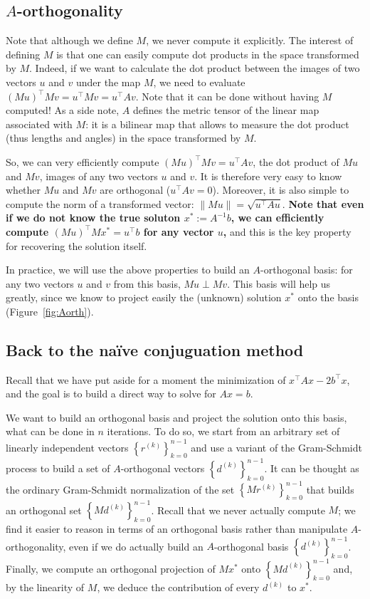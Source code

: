 \documentclass[notitlepage,oneside]{book}
\begin{document}
\subsection{$A$-orthogonality}

Note that although we define $M$, we never compute it explicitly.
The interest of defining $M$ is that one can easily compute dot products in the space transformed by $M$.
Indeed, if we want to calculate the dot product between the images of two vectors $u$ and $v$ under the map $M$,
we need to evaluate $(Mu)^\top Mv = u^\top Mv = u^\top Av$.
Note that it can be done without having $M$ computed! As a side note, $A$ defines the metric tensor of the linear map associated with $M$:
it is a bilinear map that allows to measure the dot product (thus lengths and angles) in the space transformed by $M$.


So, we can very efficiently compute $(Mu)^\top Mv = u^\top Av$, the dot product of $Mu$ and $Mv$, images of any two vectors $u$ and $v$.
It is therefore very easy to know whether $Mu$ and $Mv$ are orthogonal ($u^\top Av = $0).
Moreover, it is also simple to compute the norm of a transformed vector: $\|Mu\|=\sqrt{u^\top Au}$.
\textbf{Note that even if we do not know the true soluton $x^* := A^{-1}b$, we can efficiently compute $(Mu)^\top Mx^* = u^\top b$ for any vector $u$,}
and this is the key property for recovering the solution itself.


\begin{framed}
In practice, we will use the above properties to build an $A$-orthogonal basis: for any two vectors $u$ and $v$ from this basis, $Mu \perp Mv$.
This basis will help us greatly, since we know to project easily the (unknown) solution $x^*$ onto the basis (Figure~\ref{fig:Aorth}).
\end{framed}

\subsection{Back to the naïve conjuguation method}
Recall that we have put aside for a moment the minimization of $x^\top A x - 2b^\top x$,
and the goal is to build a direct way to solve for $Ax=b$.

We want to build an orthogonal basis and project the solution onto this basis, what can be done in $n$ iterations.
To do so, we start from an arbitrary set of linearly independent vectors $\left\{r^{(k)}\right\}_{k=0}^{n-1}$
and use a variant of the Gram-Schmidt process to build a set of $A$-orthogonal vectors $\left\{d^{(k)}\right\}_{k=0}^{n-1}$.
It can be thought as the ordinary Gram-Schmidt normalization of the set $\left\{Mr^{(k)}\right\}_{k=0}^{n-1}$ that builds an orthogonal set $\left\{Md^{(k)}\right\}_{k=0}^{n-1}$.
Recall that we never actually compute $M$; we find it easier to reason in terms of an orthogonal basis rather than manipulate $A$-orthogonality,
even if we do actually build an $A$-orthogonal basis $\left\{d^{(k)}\right\}_{k=0}^{n-1}$.
Finally, we compute an orthogonal projection of $Mx^*$ onto $\left\{Md^{(k)}\right\}_{k=0}^{n-1}$ and, by the linearity of $M$, we deduce the contribution of every $d^{(k)}$ to $x^*$.
\end{document}

